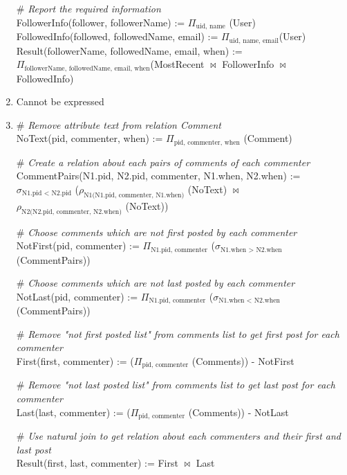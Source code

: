 \documentclass[letter, 9pt]{article}
\begin{document}
\begin{enumerate}
    {\color{gray} \# \textit{Report the required information}} \\
    FollowerInfo(follower, followerName) := $\Pi_{\text{uid, name}}$ (User) \\
    FollowedInfo(followed, followedName, email) := $\Pi_{\text{uid, name, email}}$(User) \\
    Result(followerName, followedName, email, when) := \\$\Pi_{\text{followerName, followedName, email, when}}$(MostRecent $\bowtie$ FollowerInfo $\bowtie$ FollowedInfo) 
    
    \item Cannot be expressed
    
    \item {\color{gray} \# \textit{Remove attribute text from relation Comment}} \\
    NoText(pid, commenter, when) := $\Pi_{\text{pid, commenter, when}}$ (Comment) 
    
    {\color{gray} \# \textit{Create a relation about each pairs of comments of each commenter}} \\
    CommentPairs(N1.pid, N2.pid, commenter, N1.when, N2.when) := $\sigma_{\text{N1.pid $<$ N2.pid}}$ ($\rho_{\text{N1(N1.pid, commenter, N1.when)}}$ (NoText) $\bowtie$ $\rho_{\text{N2(N2.pid, commenter, N2.when)}}$ (NoText)) 
    
    {\color{gray} \# \textit{Choose comments which are not first posted by each commenter}} \\
    NotFirst(pid, commenter) := $\Pi_{\text{N1.pid, commenter}}$ ($\sigma_{\text{N1.when $>$ N2.when}}$ (CommentPairs)) 
    
    {\color{gray} \# \textit{Choose comments which are not last posted by each commenter}} \\
    NotLast(pid, commenter) := $\Pi_{\text{N1.pid, commenter}}$ ($\sigma_{\text{N1.when $<$ N2.when}}$ (CommentPairs)) 
    
    {\color{gray} \# \textit{Remove "not first posted list" from comments list to get first post for each commenter}} \\
    First(first, commenter) := ($\Pi_{\text{pid, commenter}}$ (Comments)) - NotFirst
    
    {\color{gray} \# \textit{Remove "not last posted list" from comments list to get last post for each commenter}} \\
    Last(last, commenter) := ($\Pi_{\text{pid, commenter}}$ (Comments)) - NotLast
    
    {\color{gray} \# \textit{Use natural join to get relation about each commenters and their first and last post}} \\
    Result(first, last, commenter) := First $\bowtie$ Last
\end{enumerate}
\end{document}
